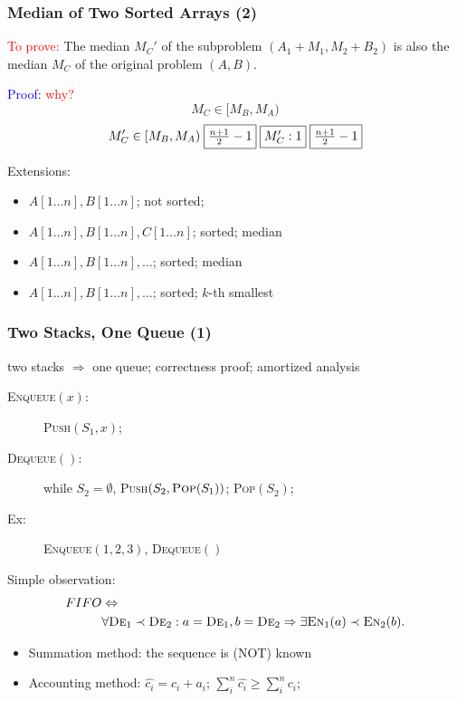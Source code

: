 \documentclass{beamer}
\begin{document}
\begin{frame}
  \frametitle{Median of Two Sorted Arrays (2)}
  
  \textcolor{red}{To prove:} The median $M_C'$ of the subproblem $(A_1 + M_1,
  M_2 + B_2)$ is also the median $M_C$ of the original problem $(A,B)$.
  
  \vspace{0.50cm}  
  \textcolor{blue}{Proof: \textcolor{red}{why?}} 
  \[ M_C \in [M_B, M_A) \]
  \[ 
    M_C' \in [M_B, M_A)\; \fbox{$\frac{n+1}{2}-1$}\; \fbox{$M_C': 1$}\;
    \fbox{$\frac{n+1}{2}-1$}
  \]
  
  \begin{block}{Extensions:}
    \begin{itemize}
      \item $A[1 \ldots n], B[1 \ldots n]$; not sorted;
      \item $A[1 \ldots n], B[1 \ldots n], C[1 \ldots n]$; sorted; median
      \item $A[1 \ldots n], B[1 \ldots n], \ldots$; sorted; median
      \item $A[1 \ldots n], B[1 \ldots n], \ldots$; sorted; $k$-th smallest 
    \end{itemize}
  \end{block}
\end{frame}

\begin{frame}
  \frametitle{Two Stacks, One Queue (1)}
  
  \begin{Problem}
    two stacks $\Rightarrow$ one queue; correctness proof; amortized analysis
    \begin{description}
      \item[\textsc{Enqueue}$(x)$:] \textsc{Push}$(S_1, x)$; 
      \item[\textsc{Dequeue}$()$:] while $S_2 = \emptyset$,
      \textsc{Push}$(S_2, \textsc{Pop}(S_1))$; \textsc{Pop}$(S_2)$; 
      \item[Ex:] \textsc{Enqueue}$(1,2,3)$, \textsc{Dequeue}$()$
    \end{description}
  \end{Problem}
  
  \vspace{0.30cm}
  Simple observation: 
  \begin{align*}
    FIFO &\Leftrightarrow \\
    &\forall \textsc{De}_1 \prec \textsc{De}_2: a =
    \textsc{De}_1, b = \textsc{De}_2 \Rightarrow \exists \textsc{En}_1(a) \prec
    \textsc{En}_2(b).
  \end{align*}
  \begin{itemize}
    \item Summation method: the sequence is (\uppercase{not}) known
    \item Accounting method: $\hat{c_i} = c_i + a_i$; $\sum_i^n \hat{c_i} \geq
    \sum_i^n c_i$; 
  \end{itemize}
\end{frame}
\end{document}
